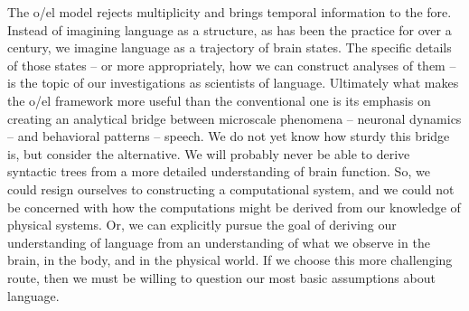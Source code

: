   The o/el model rejects multiplicity and brings temporal information to the fore. Instead of imagining language as a structure, as has been the practice for over a century, we imagine language as a trajectory of brain states. The specific details of those states -- or more appropriately, how we can construct analyses of them -- is the topic of our investigations as scientists of language. Ultimately what makes the o/el framework more useful than the conventional one is its emphasis on creating an analytical bridge between microscale phenomena -- neuronal dynamics -- and  behavioral patterns -- speech. We do not yet know how sturdy this bridge is, but consider the alternative. We will probably never be able to derive syntactic trees from a more detailed understanding of brain function. So, we could resign ourselves to constructing a computational system, and we could not be concerned with how the computations might be derived from our knowledge of physical systems. Or, we can explicitly pursue the goal of deriving our understanding of language from an understanding of what we observe in the brain, in the body, and in the physical world. If we choose this more challenging route, then we must be willing to question our most basic assumptions about language.


